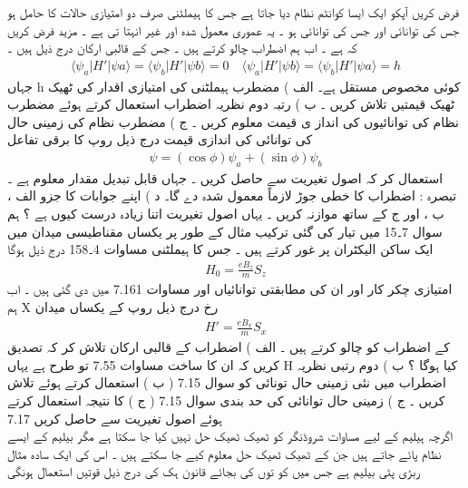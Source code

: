 فرض کریں آپکو ایک ایسا کوانٹم نظام دیا جاتا ہے جس کا ہیملٹنی  صرف دو امتیازی حالات کا حامل ہو  جس کی توانائی  اور  جس کی توانائی  ہو ۔ یہ عموری معمول شدہ اور غیر انہتا تی ہے ۔ مزید فرض کریں کہ  ہے ۔ اب ہم اضطراب  چالو کرتے ہیں ۔ جس کے قالبی ارکان درج ذیل ہیں ۔
\begin{align}
\langle \psi_{a}|H'|\psi{a}\rangle=\langle \psi_{b}|H'|\psi{b}\rangle=0\quad \langle \psi_{a}|H'|\psi{b}\rangle=\langle \psi_{b}|H'|\psi{a}\rangle=h
\end{align}
 جہاں h کوئی مخصوص مستقل ہے۔
الف ) مضطرب ہیملٹنی کی امتیازی اقدار کی ٹھیک ٹھیک قیمتیں تلاش کریں ۔
ب ) رتبہ دوم نظریہ اضطراب استعمال کرتے ہوئے مضطرب نظام کی توانائیوں کی انداز ی قیمت معلوم کریں ۔
ج ) مضطرب نظام کی زمینی حال کی توانائی کی اندازی قیمت درج ذیل روپ کا برقی تفاعل
\begin{align}
\psi=(\cos{\phi})\psi_{a}+(\sin{\phi})\psi_{b} 
\end{align}
 استعمال کر کہ اصول تغیریت سے حاصل کریں ۔ جہاں  قابل تبدیل مقدار معلوم ہے ۔
تبصرہ : اضطراب کا خطی جوڑ لازماً معمول شدہ دے گا۔
د ) اپنے جوابات کا جزو الف ، ب ، اور ج کے ساتھ موازنہ کریں ۔ یہاں اصول تغیریت اتنا زیادہ درست کیوں ہے ؟
ہم سوال 7۔15 میں تیار کی گئی ترکیب مثال کے طور پر یکساں مقناطیسی میدان  میں ایک ساکن الیکٹران پر غور کرتے ہیں ۔ جس کا ہیملٹنی مساوات 4۔158 درج ذیل ہوگا
\begin{align}
H_{0}=\frac{eB_{z}}{m}S_{z} 
\end{align}
 امتیازی چکر کار  اور  ان کی مطابقتی توانائیاں  اور  مساوات 7.161 میں دی گئی ہیں ۔
اب ہم X رخ درج ذیل روپ کے یکساں میدان
\begin{align}
H'=\frac{eB_{x}}{m}S_{x} 
\end{align}
 کے اضطراب کو چالو کرتے ہیں ۔
الف ) اضطراب  کے قالبی ارکان تلاش کر کہ تصدیق کریں کہ ان کا ساخت مساوات 7.55 تو طرح ہے یہاں H کیا ہوگا ؟
ب ) دوم رتبی نظریہ اضطراب میں نئی زمینی حال تونائی کو سوال 7.15 ( ب ) استعمال کرتے ہوئے تلاش کریں ۔
ج ) زمینی حال توانائی کی حد بندی سوال 7.15 ( ج ) کا نتیجہ استعمال کرتے ہوئے اصول تغیریت سے حاصل کریں
7.17\\
اگرچہ ہیلیم کے لیے مساوات شروڈنگر کو ٹھیک ٹھیک حل نہیں کیا جا سکتا ہے مگر بیلیم کے ایسے نظام پائے جاتے ہیں جن کے ٹھیک ٹھیک حل معلوم کیے جا سکتے ہیں ۔ اس کی ایک  سادہ مثال ربڑی پٹی بیلیم ہے جس میں کو توں کی بجائے قانون ہک کی درج ذیل قوتیں استعمال ہونگی
